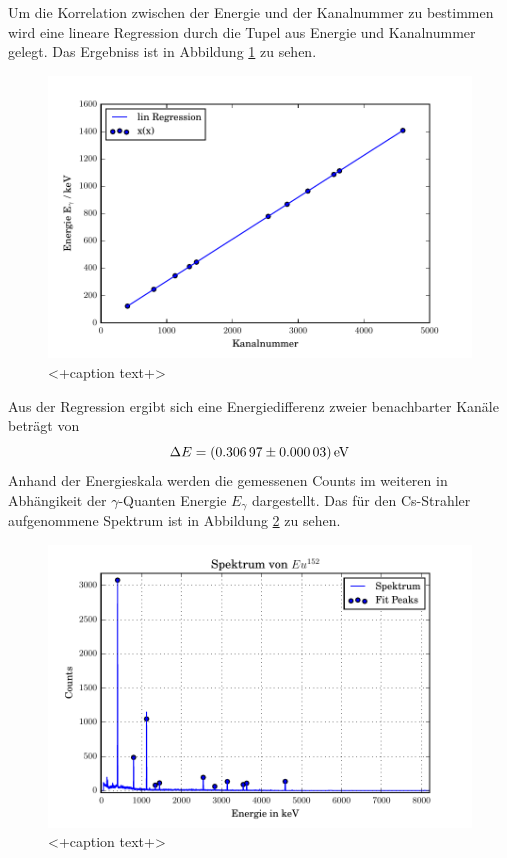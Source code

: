 Um die Korrelation zwischen der Energie und der Kanalnummer zu bestimmen wird eine lineare Regression durch die Tupel aus Energie und Kanalnummer gelegt. Das Ergebniss ist in Abbildung \ref{fig:RegCs} zu sehen. 
\begin{figure}[htpb]
  \centering
  \includegraphics[width=\textwidth]{./build/CsReg.pdf}
  \caption{<+caption text+>}
  \label{fig:RegCs}
\end{figure}
Aus der Regression ergibt sich eine Energiedifferenz zweier benachbarter Kanäle beträgt von 
\begin{equation}
  \Delta E = (\num{0.30697 +- 0.00003}) \, \text{eV}
  \label{eqn:Reg}
\end{equation}
Anhand der Energieskala werden die gemessenen Counts im weiteren in Abhängikeit der $\gamma$-Quanten Energie $E_{\gamma}$ dargestellt. Das für den Cs-Strahler aufgenommene Spektrum ist in Abbildung \ref{fig:SpekCs} zu sehen. 
\begin{figure}[htpb]
  \centering
  \includegraphics[width=\textwidth]{./build/SpektEu.pdf}
  \caption{<+caption text+>}
  \label{fig:SpekCs}
\end{figure}

